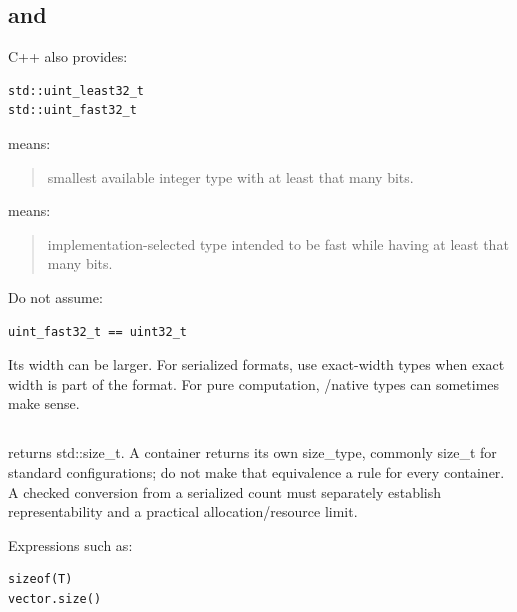 \subsection{\texorpdfstring{ and }{least and fast}}\label{05-engine-i-ch002-least-and-fast}

\hypertarget{05-engine-i-ch002-least-and-fast}{}

C++ also provides:

\begin{verbatim}
std::uint_least32_t
std::uint_fast32_t
\end{verbatim}

 means:

\begin{quote}
smallest available integer type with at least that many bits.
\end{quote}

 means:

\begin{quote}
implementation-selected type intended to be fast while having at least that many bits.
\end{quote}

Do not assume:

\begin{verbatim}
uint_fast32_t == uint32_t
\end{verbatim}

Its width can be larger. For serialized formats, use exact-width types when exact width is part of the format. For pure computation, /native types can sometimes make sense.

\subsection{\texorpdfstring{}{std::size\_t}}\label{05-engine-i-ch002-stdsize_t}

\hypertarget{05-engine-i-ch002-stdsize_t}{}

 returns std::size\_t. A container returns its own size\_type, commonly size\_t for standard configurations; do not make that equivalence a rule for every container. A checked conversion from a serialized count must separately establish representability and a practical allocation/resource limit.

Expressions such as:

\begin{verbatim}
sizeof(T)
vector.size()
\end{verbatim}

